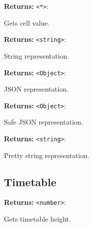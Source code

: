 \documentclass[12pt,a4paper]{article}
\begin{document}
\noindent \textbf{Returns:} \texttt{<*>}:

\noindent Gets cell value.

\vspace{5mm}
\noindent {}


\noindent \textbf{Returns:} \texttt{<string>}:

\noindent String representation.

\vspace{5mm}
\noindent {}


\noindent \textbf{Returns:} \texttt{<Object>}:

\noindent JSON representation.

\vspace{5mm}
\noindent {}


\noindent \textbf{Returns:} \texttt{<Object>}:

\noindent Safe JSON representation.

\vspace{5mm}
\noindent {}


\noindent \textbf{Returns:} \texttt{<string>}:

\noindent Pretty string representation.


\subsection{Timetable}
\vspace{5mm}
\noindent {}


\noindent \textbf{Returns:} \texttt{<number>}:

\noindent Gets timetable height.

\vspace{5mm}
\noindent {}
\end{document}
